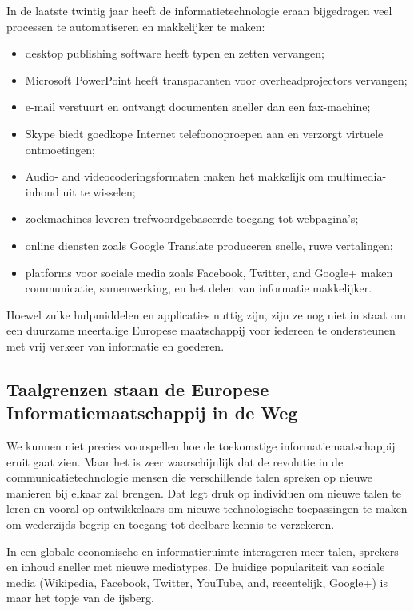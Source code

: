 \documentclass[]{../../metanetpaper}
\begin{document}
\begin{multicols}{2}
     In de laatste twintig jaar heeft de informatietechnologie eraan bijgedragen veel processen te automatiseren en makkelijker te maken:
    \begin{itemize}
 	\item desktop publishing software heeft typen en zetten vervangen;
 	\item Microsoft PowerPoint heeft transparanten voor overheadprojectors vervangen;
 	\item e-mail verstuurt en ontvangt documenten sneller dan een fax-machine;
 	\item Skype biedt goedkope Internet telefoonoproepen aan en verzorgt virtuele ontmoetingen;
 	\item Audio- and videocoderingsformaten maken het makkelijk om multimedia-inhoud uit te wisselen;
 	\item zoekmachines leveren trefwoordgebaseerde toegang tot webpagina's;
 	\item online diensten zoals Google Translate produceren snelle, ruwe vertalingen;
 	\item platforms voor sociale media zoals Facebook, Twitter, and Google+ maken communicatie, samenwerking, en het delen van informatie makkelijker.
     \end{itemize}

     Hoewel zulke hulpmiddelen en applicaties nuttig zijn, zijn ze nog niet in staat om een duurzame meertalige Europese maatschappij voor iedereen te ondersteunen met vrij verkeer van informatie en goederen.



\subsection{Taalgrenzen staan de Europese Informatiemaatschappij in de Weg}
  
    We kunnen niet precies voorspellen hoe de toekomstige informatiemaatschappij eruit gaat zien. Maar het is zeer waarschijnlijk dat de revolutie in de communicatietechnologie mensen die verschillende talen spreken op nieuwe manieren bij elkaar zal brengen. Dat legt druk op individuen om nieuwe talen te leren en vooral op ontwikkelaars om nieuwe technologische toepassingen te maken om wederzijds begrip en toegang tot deelbare kennis te verzekeren.


 In een globale economische en informatieruimte interageren meer talen, sprekers en inhoud sneller met nieuwe mediatypes. De huidige populariteit van sociale media (Wikipedia, Facebook, Twitter, YouTube, and, recentelijk, Google+) is maar het topje van de ijsberg.


\end{multicols}
\end{document}
